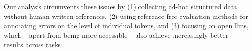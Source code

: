 Our analysis circumvents these issues by (1) collecting ad-hoc structured data without human-written references, (2) using reference-free evaluation methods for annotating errors on the level of individual tokens, and (3) focusing on open \acp{llm}, which -- apart from being more accessible -- also achieve increasingly better results across tasks \cite{zheng2023judging,open-llm-leaderboard}.





